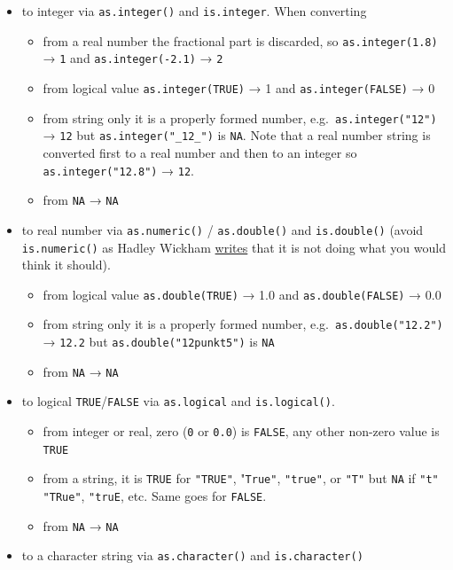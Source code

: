 \documentclass[
]{book}
\providecommand{\tightlist}{%
  \setlength{\itemsep}{0pt}\setlength{\parskip}{0pt}}
\begin{document}
\begin{itemize}
\tightlist
\item
  to integer via \texttt{as.integer()} and \texttt{is.integer}. When converting

  \begin{itemize}
  \tightlist
  \item
    from a real number the fractional part is discarded, so \texttt{as.integer(1.8)} → \texttt{1} and \texttt{as.integer(-2.1)} → \texttt{2}
  \item
    from logical value \texttt{as.integer(TRUE)} → 1 and \texttt{as.integer(FALSE)} → 0
  \item
    from string only it is a properly formed number, e.g.~\texttt{as.integer("12")} → \texttt{12} but \texttt{as.integer("\_12\_")} is \texttt{NA}. Note that a real number string is converted first to a real number and then to an integer so \texttt{as.integer("12.8")} → \texttt{12}.
  \item
    from \texttt{NA} → \texttt{NA}
  \end{itemize}
\item
  to real number via \texttt{as.numeric()} / \texttt{as.double()} and \texttt{is.double()} (avoid \texttt{is.numeric()} as Hadley Wickham \href{https://adv-r.hadley.nz/vectors-chap.html}{writes} that it is not doing what you would think it should).

  \begin{itemize}
  \tightlist
  \item
    from logical value \texttt{as.double(TRUE)} → 1.0 and \texttt{as.double(FALSE)} → 0.0
  \item
    from string only it is a properly formed number, e.g.~\texttt{as.double("12.2")} → \texttt{12.2} but \texttt{as.double("12punkt5")} is \texttt{NA}
  \item
    from \texttt{NA} → \texttt{NA}
  \end{itemize}
\item
  to logical \texttt{TRUE}/\texttt{FALSE} via \texttt{as.logical} and \texttt{is.logical()}.

  \begin{itemize}
  \tightlist
  \item
    from integer or real, zero (\texttt{0} or \texttt{0.0}) is \texttt{FALSE}, any other non-zero value is \texttt{TRUE}
  \item
    from a string, it is \texttt{TRUE} for \texttt{"TRUE"}, "\texttt{True"}, \texttt{"true"}, or \texttt{"T"} but \texttt{NA} if \texttt{"t"} \texttt{"TRue"}, \texttt{"truE}, etc. Same goes for \texttt{FALSE}.
  \item
    from \texttt{NA} → \texttt{NA}
  \end{itemize}
\item
  to a character string via \texttt{as.character()} and \texttt{is.character()}


\end{itemize}
\end{document}
